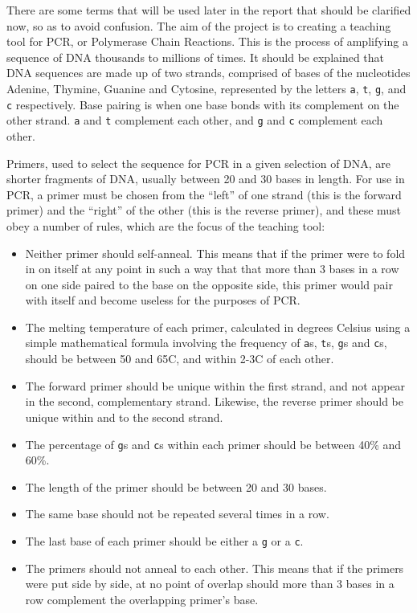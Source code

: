 There are some terms that will be used later in the report that should
be clarified now, so as to avoid confusion.
The aim of the project is to creating a teaching tool for PCR, or
Polymerase Chain Reactions.
This is the process of amplifying a sequence of DNA thousands to
millions of times.
It should be explained that DNA sequences are made up of two strands,
comprised of bases of the nucleotides Adenine, Thymine, Guanine and
Cytosine, represented by the letters \verb£a£, \verb£t£, \verb£g£, and
\verb£c£ respectively.
Base pairing is when one base bonds with its complement on the other
strand.
\verb£a£ and \verb£t£ complement each other, and \verb£g£ and \verb£c£
complement each other.

Primers, used to select the sequence for PCR in a given selection of
DNA, are shorter fragments of DNA, usually between 20 and 30 bases in
length.
For use in PCR, a primer must be chosen from the ``left'' of one
strand (this is the forward primer) and the ``right'' of the other
(this is the reverse primer), and these must obey a number of rules,
which are the focus of the teaching tool:
\begin{itemize}
\item Neither primer should self-anneal. 
  This means that if the primer were to fold in on itself at any point
  in such a way that that more than 3 bases in a row on one side
  paired to the base on the opposite side, this primer would pair with
  itself and become useless for the purposes of PCR.
\item The melting temperature of each primer, calculated in degrees
  Celsius using a simple mathematical formula involving the frequency
  of \verb£a£s, \verb£t£s, \verb£g£s and \verb£c£s, should be between
  50 and 65\degree C, and within 2-3\degree C of each other.
\item The forward primer should be unique within the first strand, and
  not appear in the second, complementary strand. Likewise, the
  reverse primer should be unique within and to the second strand.
\item The percentage of \verb£g£s and \verb£c£s within each primer
  should be between 40\% and 60\%.
\item The length of the primer should be between 20 and 30 bases.
\item The same base should not be repeated several times in a row.
\item The last base of each primer should be either a \verb£g£ or a
  \verb£c£.
\item The primers should not anneal to each other. 
  This means that if the primers were put side by side, at no point of
  overlap should more than 3 bases in a row complement the overlapping
  primer’s base.
\end{itemize}

